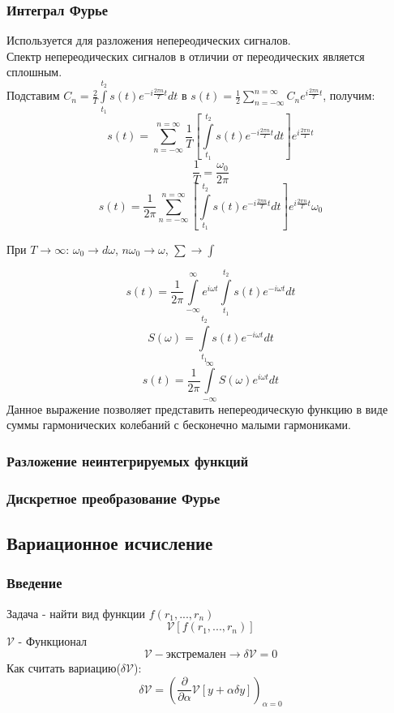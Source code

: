 \subsubsection{Интеграл Фурье}
Используется для разложения непереодических сигналов.\\
Спектр непереодических сигналов в отличии от переодических является сплошным.\\
Подставим $C_{n}=\frac{2}{T}\int\limits_{t_{1}}^{t_{2}}s(t)e^{-i\frac{2\pi n}{T}t}dt$ в $s(t)=\frac{1}{2}\sum\limits_{n=-\infty}^{n=\infty}C_{n}e^{i\frac{2\pi n}{T}t}$, получим:
$$s(t)=\sum\limits_{n=-\infty}^{n=\infty}\frac{1}{T}\left[\int\limits_{t_{1}}^{t_{2}}s(t)e^{-i\frac{2\pi n}{T}t}dt\right]e^{i\frac{2\pi n}{T}t}$$
$$\frac{1}{T}=\frac{\omega_{0}}{2\pi}$$
$$s(t)=\frac{1}{2\pi}\sum\limits_{n=-\infty}^{n=\infty}\left[\int\limits_{t_{1}}^{t_{2}}s(t)e^{-i\frac{2\pi n}{T}t}dt\right]e^{i\frac{2\pi n}{T}t}\omega_{0}$$

При $T\longrightarrow\infty$: $\omega_{0}\longrightarrow d\omega$, $n\omega_{0}\longrightarrow \omega$, $\sum\longrightarrow\int$

$$s(t)=\frac{1}{2\pi}\int\limits_{-\infty}^{\infty}e^{i\omega t}\int\limits_{t_{1}}^{t_{2}}s(t)e^{-i\omega t}dt$$
$$S(\omega)=\int\limits_{t_{1}}^{t_{2}}s(t)e^{-i\omega t}dt$$
$$s(t)=\frac{1}{2\pi}\int\limits_{-\infty}^{\infty}S(\omega)e^{i\omega t}dt$$
Данное выражение позволяет представить непереодическую функцию в виде суммы гармонических колебаний с бесконечно малыми гармониками.\\

\subsubsection{Разложение неинтегрируемых функций}

\subsubsection{Дискретное преобразование Фурье}

\subsection{Вариационное исчисление}

\subsubsection{Введение}
Задача - найти вид функции $f(r_{1},...,r_{n})$
$$\mathcal{V}[f(r_{1},...,r_{n})]$$
$\mathcal{V}$ - Функционал\\
$$\mathcal{V} - \text{экстремален}\longrightarrow\delta\mathcal{V}=0$$
Как считать вариацию($\delta\mathcal{V}$):
$$\delta\mathcal{V}=\left(\frac{\partial}{\partial\alpha}\mathcal{V}[y+\alpha\delta y]\right)_{\alpha=0}$$


